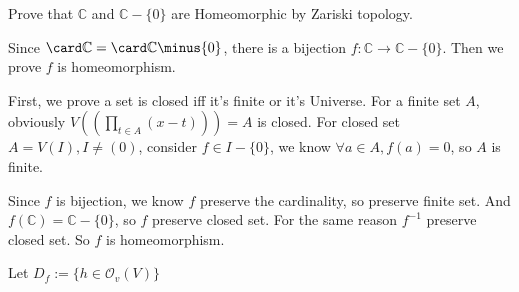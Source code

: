 \documentclass{ctexart}
\newif\ifpreface
\begin{document}
\large
\setlength{\baselineskip}{1.2em}
\ifpreface
    
\newgeometry{left=2cm,right=2cm,top=2cm,bottom=2cm}
\else
{}
\maketitle
\fi
\begin{problem}
 Prove that $\mathbb{C}$ and $\mathbb{C}\minus\{0\}$ are Homeomorphic by Zariski topology. 
\end{problem}

\begin{solution}
 Since $\card \mathbb{C}=\card \mathbb{C}\minus \{0\}$, there is a bijection $f:\mathbb{C}\to \mathbb{C}\minus\{0\}$. Then we prove $f$ is homeomorphism. 
 
 First, we prove a set is closed iff it's finite or it's Universe. For a finite set $A$, obviously $V((\prod_{t\in A}(x-t)))=A$ is closed. For closed set $A=V(I),I\neq (0)$, consider $f\in I\minus\{0\}$, we know $\forall a\in A,f(a)=0$, so $A$ is finite. 

 Since $f$ is bijection, we know $f$ preserve the cardinality, so preserve finite set. And $f(\mathbb{C})=\mathbb{C}\minus\{0\}$, so $f$ preserve closed set. For the same reason $f^{-1}$ preserve closed set. So $f$ is homeomorphism.  
\end{solution}

\begin{problem}
 Let $D_f:=\{h\in \mathcal{O}_v(V)\}$
\end{problem}
\end{document}
